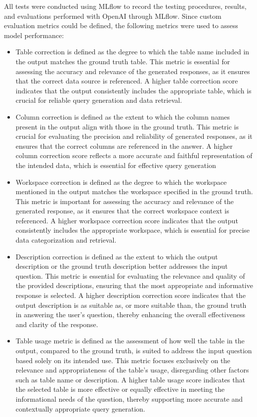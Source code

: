     All tests were conducted using MLflow to record the testing procedures, results, and evaluations performed with OpenAI through MLflow. Since custom evaluation metrics could be defined, the following metrics were used to assess model performance:

    \begin{itemize}
        \item Table correction is defined as the degree to which the table name included in the output matches the ground truth table. This metric is essential for assessing the accuracy and relevance of the generated responses, as it ensures that the correct data source is referenced. A higher table correction score indicates that the output consistently includes the appropriate table, which is crucial for reliable query generation and data retrieval.
        \item Column correction is defined as the extent to which the column names present in the output align with those in the ground truth. This metric is crucial for evaluating the precision and reliability of generated responses, as it ensures that the correct columns are referenced in the answer. A higher column correction score reflects a more accurate and faithful representation of the intended data, which is essential for effective query generation
        \item Workspace correction is defined as the degree to which the workspace mentioned in the output matches the workspace specified in the ground truth. This metric is important for assessing the accuracy and relevance of the generated response, as it ensures that the correct workspace context is referenced. A higher workspace correction score indicates that the output consistently includes the appropriate workspace, which is essential for precise data categorization and retrieval.
        \item Description correction is defined as the extent to which the output description or the ground truth description better addresses the input question. This metric is essential for evaluating the relevance and quality of the provided descriptions, ensuring that the most appropriate and informative response is selected. A higher description correction score indicates that the output description is as suitable as, or more suitable than, the ground truth in answering the user's question, thereby enhancing the overall effectiveness and clarity of the response.
        \item Table usage metric is defined as the assessment of how well the table in the output, compared to the ground truth, is suited to address the input question based solely on its intended use. This metric focuses exclusively on the relevance and appropriateness of the table’s usage, disregarding other factors such as table name or description. A higher table usage score indicates that the selected table is more effective or equally effective in meeting the informational needs of the question, thereby supporting more accurate and contextually appropriate query generation.
    \end{itemize}
    
